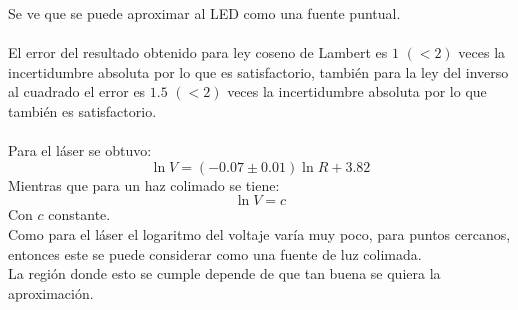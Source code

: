 \documentclass[DIV=calc, paper=a4, fontsize=11pt]{scrartcl}
\begin{document}
Se ve que se puede aproximar al LED como una fuente puntual.
\\
\\
El error del resultado obtenido para ley coseno de Lambert es $1$ $(<2)$ veces la incertidumbre absoluta por lo que es satisfactorio, también para la ley del inverso al cuadrado el error es $1.5$ $(<2)$ veces la incertidumbre absoluta por lo que también es satisfactorio.
\\
\\
Para el láser se obtuvo:
$$\ln{V}=(-0.07\pm0.01)\ln{R}+3.82$$
Mientras que para un haz colimado se tiene:
$$ \ln{V}=c $$
Con $c$ constante.
\\
Como para el láser el logaritmo del voltaje varía muy poco, para puntos cercanos, entonces este se puede considerar como una fuente de luz colimada.
\\
La región donde esto se cumple depende de que tan buena se quiera la aproximación. 
\nocite{*}
\end{document}
